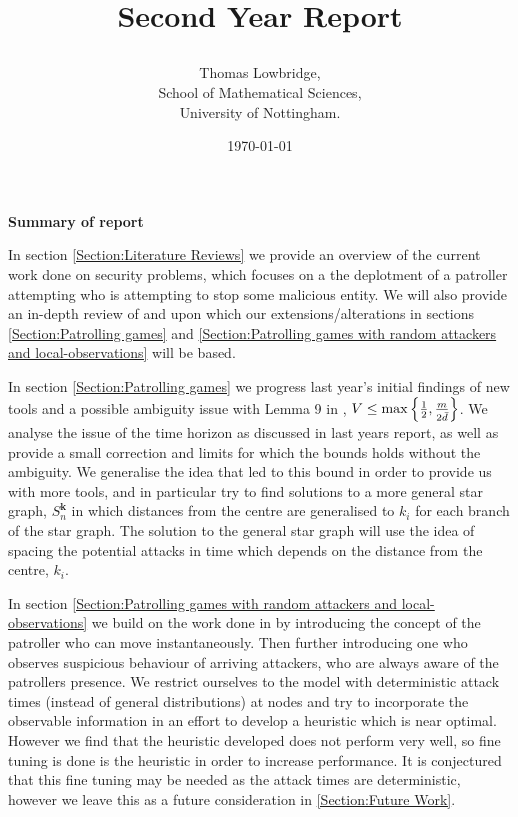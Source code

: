 \documentclass[a4paper,10pt]{article}
\title{\begin{Huge}\textbf{Second Year Report} \end{Huge}}
\date{\today}
\author{Thomas Lowbridge, \\ School of Mathematical Sciences, \\ University of Nottingham.}
\theoremstyle{definition}
\theoremstyle{definition}
\theoremstyle{remark}
\theoremstyle{definition}
\begin{document}
\pagestyle{empty}
{
  \renewcommand{\thispagestyle}[1]{}
  \maketitle
  \tableofcontents  
}
\clearpage
\pagestyle{plain}


\setlength{\parindent}{0pt}
\setlength{\parskip}{1em}

\newpage
{}

\pagestyle{empty}
{
\begin{center}
\begin{huge}
\textbf{Summary of report}
\end{huge}
\end{center}


In section \ref{Section:Literature Reviews} we provide an overview of the current work done on security problems, which focuses on a the deplotment of a patroller attempting who is attempting to stop some malicious entity. We will also provide an in-depth review of \cite{Alpern2011} and \cite{Lin2013} upon which our extensions/alterations in sections \ref{Section:Patrolling games} and \ref{Section:Patrolling games with random attackers and local-observations} will be based.

In section \ref{Section:Patrolling games} we progress last year's initial findings of new tools and a possible ambiguity issue with Lemma 9 in \cite{Alpern2011}, $V \leq \max \left\{ \frac{1}{2},\frac{m}{\raisebox{-0.5ex}{$\scriptstyle 2 \bar{d}$}} \right\}$. We analyse the issue of the time horizon as discussed in last years report, as well as provide a small correction and limits for which the bounds holds without the ambiguity. We generalise the idea that led to this bound in order to provide us with more tools, and in particular try to find solutions to a more general star graph, $S_{n}^{\bm{k}}$ in which distances from the centre are generalised to $k_{i}$ for each branch of the star graph. The solution to the general star graph will use the idea of spacing the potential attacks in time which depends on the distance from the centre, $k_{i}$.

In section \ref{Section:Patrolling games with random attackers and local-observations} we build on the work done in \cite{Lin2013} by introducing the concept of the patroller who can move instantaneously. Then further introducing one who observes suspicious behaviour of arriving attackers, who are always aware of the patrollers presence. We restrict ourselves to the model with deterministic attack times (instead of general distributions) at nodes and try to incorporate the observable information in an effort to develop a heuristic which is near optimal. However we find that the heuristic developed does not perform very well, so fine tuning is done is the heuristic in order to increase performance. It is conjectured that this fine tuning may be needed as the attack times are deterministic, however we leave this as a future consideration in \ref{Section:Future Work}.

}
\end{document}

